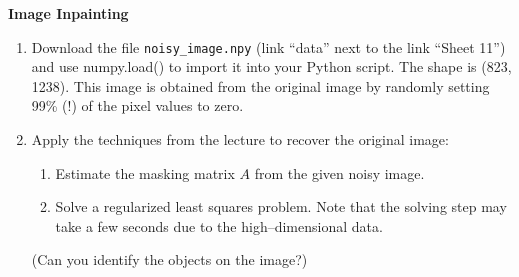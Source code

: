 \textbf{Image Inpainting}
\begin{enumerate}
	\item Download the file \texttt{noisy\_image.npy} (link ``data'' next to the link ``Sheet 11'') and use numpy.load() to import it into your Python script. The shape is (823, 1238). This image is obtained from the original image by randomly setting 99\% (!) of the pixel values to zero.
	\item Apply the techniques from the lecture to recover the original image:
	\begin{enumerate}
		\item Estimate the masking matrix $A$ from the given noisy image.
		\item Solve a regularized least squares problem. Note that the solving step may take a few seconds due to the high--dimensional data.
	\end{enumerate}
	(Can you identify the objects on the image?)
\end{enumerate}


